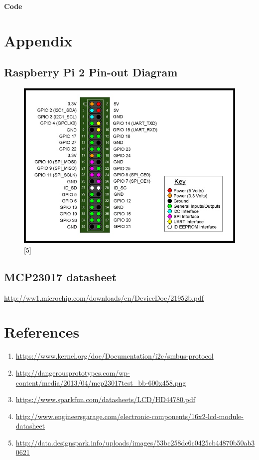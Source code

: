 \documentclass[11pt,a4paper]{article}
\begin{document}
	\newpage 
	\textbf{Code}
	\vspace{0.3cm}
	
	
	
	\vspace{0.3cm}
	
	
	\newpage
	\section{Appendix}
	
	\subsection{Raspberry Pi 2 Pin-out Diagram}
	\begin{figure}[h!]
		\includegraphics[scale=0.6]{RaspberryPi2_pinout.jpg}
		\centering
		\caption{[5]}
	\end{figure}
			
	\subsection{MCP23017 datasheet}
			
	\url{http://ww1.microchip.com/downloads/en/DeviceDoc/21952b.pdf}
			
	\newpage
	\section{References}
	\begin{enumerate}
		\item \url{https://www.kernel.org/doc/Documentation/i2c/smbus-protocol}
		\item \url{http://dangerousprototypes.com/wp-content/media/2013/04/mcp23017test_bb-600x458.png}
		\item \url{https://www.sparkfun.com/datasheets/LCD/HD44780.pdf}
		\item \url{http://www.engineersgarage.com/electronic-components/16x2-lcd-module-datasheet}
		\item \url{http://data.designspark.info/uploads/images/53bc258dc6c0425cb44870b50ab30621}
    \end{enumerate}
	
\end{document}
